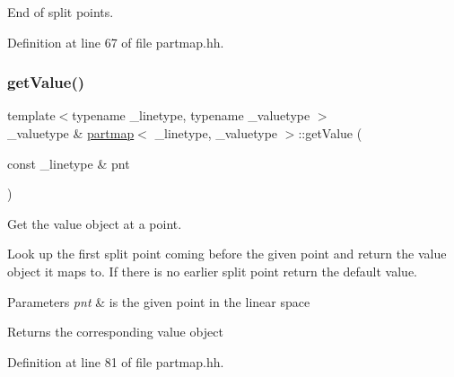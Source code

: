 End of split points. 



Definition at line 67 of file partmap.\+hh.

\mbox{\label{classpartmap_af5e8ac68250b9e90bef2481df65bdeb3}} 
\subsubsection{\texorpdfstring{getValue()}{getValue()}\hspace{0.1cm}{\footnotesize\ttfamily [1/2]}}
{\footnotesize\ttfamily template$<$typename \+\_\+linetype, typename \+\_\+valuetype $>$ \\
\+\_\+valuetype \& \mbox{\hyperlink{classpartmap}{partmap}}$<$ \+\_\+linetype, \+\_\+valuetype $>$\+::get\+Value (\begin{DoxyParamCaption}\item[{const \+\_\+linetype \&}]{pnt }\end{DoxyParamCaption})}



Get the value object at a point. 

Look up the first split point coming before the given point and return the value object it maps to. If there is no earlier split point return the default value. 
\begin{DoxyParams}{Parameters}
{\em pnt} & is the given point in the linear space \\
\hline
\end{DoxyParams}
\begin{DoxyReturn}{Returns}
the corresponding value object 
\end{DoxyReturn}


Definition at line 81 of file partmap.\+hh.


